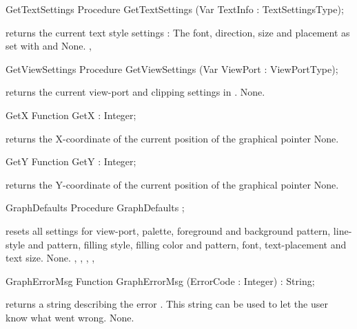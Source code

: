 \begin{procedure}{GetTextSettings}
\Declaration
Procedure GetTextSettings (Var TextInfo : TextSettingsType);

\Description
{} returns the current text style settings : The font,
direction, size and placement as set with  and
\Errors
None.
\SeeAlso
{}, 
\end{procedure}
\begin{procedure}{GetViewSettings}
\Declaration
Procedure GetViewSettings (Var ViewPort : ViewPortType);

\Description
{} returns the current view-port and clipping settings in
.
\Errors
None.
\SeeAlso
{}
\end{procedure}
\begin{function}{GetX}
\Declaration
Function GetX  : Integer;

\Description
{} returns the X-coordinate of the current position of
the graphical pointer
\Errors
None.
\SeeAlso
{}
\end{function}
\begin{function}{GetY}
\Declaration
Function GetY  : Integer;

\Description
{} returns the Y-coordinate of the current position of
the graphical pointer
\Errors
None.
\SeeAlso
{}
\end{function}
\begin{procedure}{GraphDefaults}
\Declaration
Procedure GraphDefaults ;

\Description
{} resets all settings for view-port, palette,
foreground and background pattern, line-style and pattern, filling style,
filling color and pattern, font, text-placement and
text size.
\Errors
None.
\SeeAlso
{}, , ,
, 
\end{procedure}
\begin{function}{GraphErrorMsg}
\Declaration
Function GraphErrorMsg (ErrorCode : Integer) : String;

\Description
{}
returns a string describing the error . This string can be
used to let the user know what went wrong.
\Errors
None.
\SeeAlso
{}
\end{function}
